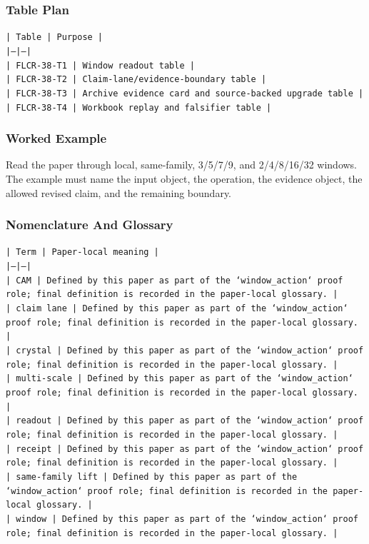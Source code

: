 \documentclass[11pt]{article}
\begin{document}
\subsubsection*{Table Plan}

\noindent\texttt{| Table | Purpose |}\\
\noindent\texttt{|---|---|}\\
\noindent\texttt{| FLCR-38-T1 | Window readout table |}\\
\noindent\texttt{| FLCR-38-T2 | Claim-lane/evidence-boundary table |}\\
\noindent\texttt{| FLCR-38-T3 | Archive evidence card and source-backed upgrade table |}\\
\noindent\texttt{| FLCR-38-T4 | Workbook replay and falsifier table |}\\

\subsubsection*{Worked Example}

Read the paper through local, same-family, 3/5/7/9, and 2/4/8/16/32 windows. The example must name the input object, the operation,
the evidence object, the allowed revised claim, and the remaining boundary.

\subsubsection*{Nomenclature And Glossary}

\noindent\texttt{| Term | Paper-local meaning |}\\
\noindent\texttt{|---|---|}\\
\noindent\texttt{| CAM | Defined by this paper as part of the `window\_action` proof role; final definition is recorded in the paper-local glossary. |}\\
\noindent\texttt{| claim lane | Defined by this paper as part of the `window\_action` proof role; final definition is recorded in the paper-local glossary. |}\\
\noindent\texttt{| crystal | Defined by this paper as part of the `window\_action` proof role; final definition is recorded in the paper-local glossary. |}\\
\noindent\texttt{| multi-scale | Defined by this paper as part of the `window\_action` proof role; final definition is recorded in the paper-local glossary. |}\\
\noindent\texttt{| readout | Defined by this paper as part of the `window\_action` proof role; final definition is recorded in the paper-local glossary. |}\\
\noindent\texttt{| receipt | Defined by this paper as part of the `window\_action` proof role; final definition is recorded in the paper-local glossary. |}\\
\noindent\texttt{| same-family lift | Defined by this paper as part of the `window\_action` proof role; final definition is recorded in the paper-local glossary. |}\\
\noindent\texttt{| window | Defined by this paper as part of the `window\_action` proof role; final definition is recorded in the paper-local glossary. |}\\
\end{document}
